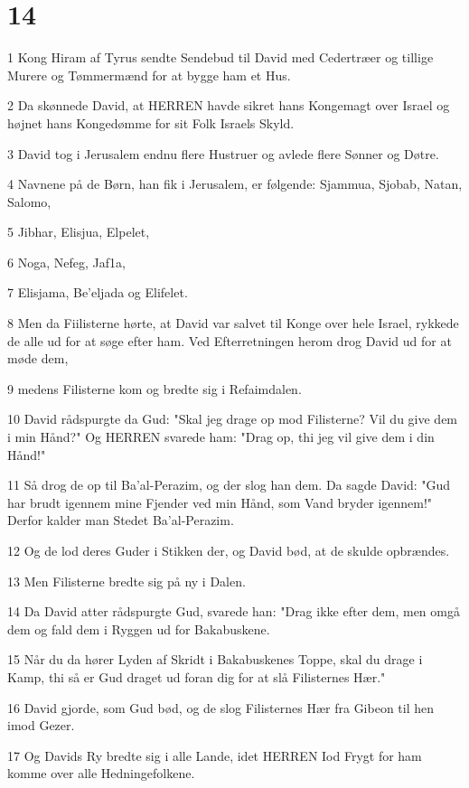 \chapter{14}

\par 1 Kong Hiram af Tyrus sendte Sendebud til David med Cedertræer og tillige Murere og Tømmermænd for at bygge ham et Hus.
\par 2 Da skønnede David, at HERREN havde sikret hans Kongemagt over Israel og højnet hans Kongedømme for sit Folk Israels Skyld.
\par 3 David tog i Jerusalem endnu flere Hustruer og avlede flere Sønner og Døtre.
\par 4 Navnene på de Børn, han fik i Jerusalem, er følgende: Sjammua, Sjobab, Natan, Salomo,
\par 5 Jibhar, Elisjua, Elpelet,
\par 6 Noga, Nefeg, Jaf1a,
\par 7 Elisjama, Be'eljada og Elifelet.
\par 8 Men da Fiilisterne hørte, at David var salvet til Konge over hele Israel, rykkede de alle ud for at søge efter ham. Ved Efterretningen herom drog David ud for at møde dem,
\par 9 medens Filisterne kom og bredte sig i Refaimdalen.
\par 10 David rådspurgte da Gud: "Skal jeg drage op mod Filisterne? Vil du give dem i min Hånd?" Og HERREN svarede ham: "Drag op, thi jeg vil give dem i din Hånd!"
\par 11 Så drog de op til Ba'al-Perazim, og der slog han dem. Da sagde David: "Gud har brudt igennem mine Fjender ved min Hånd, som Vand bryder igennem!" Derfor kalder man Stedet Ba'al-Perazim.
\par 12 Og de lod deres Guder i Stikken der, og David bød, at de skulde opbrændes.
\par 13 Men Filisterne bredte sig på ny i Dalen.
\par 14 Da David atter rådspurgte Gud, svarede han: "Drag ikke efter dem, men omgå dem og fald dem i Ryggen ud for Bakabuskene.
\par 15 Når du da hører Lyden af Skridt i Bakabuskenes Toppe, skal du drage i Kamp, thi så er Gud draget ud foran dig for at slå Filisternes Hær."
\par 16 David gjorde, som Gud bød, og de slog Filisternes Hær fra Gibeon til hen imod Gezer.
\par 17 Og Davids Ry bredte sig i alle Lande, idet HERREN Iod Frygt for ham komme over alle Hedningefolkene.

